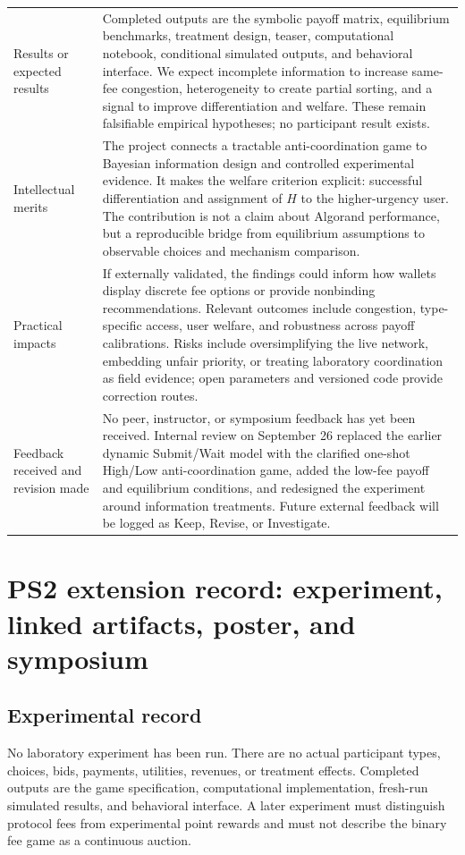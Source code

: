 \begin{table}[H]
\begin{tabularx}{\textwidth}{@{}p{}Y@{}}
Results or expected results&Completed outputs are the symbolic payoff matrix, equilibrium benchmarks, treatment design, teaser, computational notebook, conditional simulated outputs, and behavioral interface. We expect incomplete information to increase same-fee congestion, heterogeneity to create partial sorting, and a signal to improve differentiation and welfare. These remain falsifiable empirical hypotheses; no participant result exists.\\
Intellectual merits&The project connects a tractable anti-coordination game to Bayesian information design and controlled experimental evidence. It makes the welfare criterion explicit: successful differentiation and assignment of $H$ to the higher-urgency user. The contribution is not a claim about Algorand performance, but a reproducible bridge from equilibrium assumptions to observable choices and mechanism comparison.\\
Practical impacts&If externally validated, the findings could inform how wallets display discrete fee options or provide nonbinding recommendations. Relevant outcomes include congestion, type-specific access, user welfare, and robustness across payoff calibrations. Risks include oversimplifying the live network, embedding unfair priority, or treating laboratory coordination as field evidence; open parameters and versioned code provide correction routes.\\
Feedback received and revision made&No peer, instructor, or symposium feedback has yet been received. Internal review on September 26 replaced the earlier dynamic Submit/Wait model with the clarified one-shot High/Low anti-coordination game, added the low-fee payoff and equilibrium conditions, and redesigned the experiment around information treatments. Future external feedback will be logged as Keep, Revise, or Investigate.\\\bottomrule
\end{tabularx}\end{table}

\clearpage\twocolumn
\section{PS2 extension record: experiment, linked artifacts, poster, and symposium}
\subsection{Experimental record}
No laboratory experiment has been run. There are no actual participant types, choices, bids, payments, utilities, revenues, or treatment effects. Completed outputs are the game specification, computational implementation, fresh-run simulated results, and behavioral interface. A later experiment must distinguish protocol fees from experimental point rewards and must not describe the binary fee game as a continuous auction.


